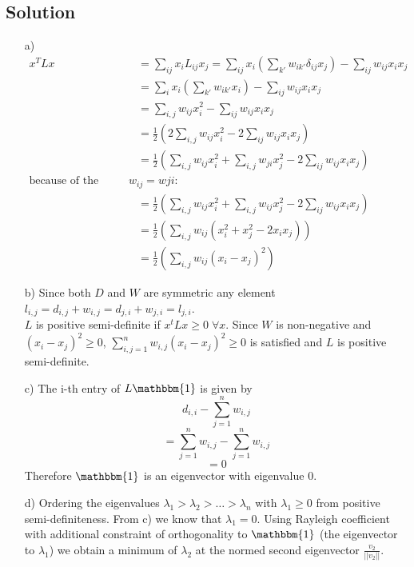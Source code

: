\documentclass[10pt]{article}
\numberwithin{equation}{section}
\begin{document}
\subsection*{Solution}
\begin{enumerate}
  \item[a)]{
\begin{align*}
	x^T Lx &= \sum_{ij} x_i L_{ij} x_j = \sum_{ij} x_i\left(\sum_{k'}w_{ik'} \delta_{ij} x_j\right) - \sum_{ij} w_{ij}x_i x_j \\
	&= \sum_{i} x_i\left(\sum_{k'}w_{ik'} x_i\right) - \sum_{ij} w_{ij}x_i x_j \\
  &= \sum_{i, j} w_{ij} x_i^2 - \sum_{ij} w_{ij}x_i x_j  \\
	&= \frac{1}{2} \left( 2 \sum_{i, j} w_{ij} x_i^2 - 2\sum_{ij} w_{ij}x_i x_j\right) \\
	&= \frac{1}{2} \left(  \sum_{i, j} w_{ij} x_i^2 + \sum_{i, j} w_{ji} x_j^2 - 2\sum_{ij}w_{ij}x_i x_j\right) \\
\text{because of the symmetry of W} w_{ij} = w{ji}:\\
	&= \frac{1}{2} \left(  \sum_{i, j} w_{ij} x_i^2 + \sum_{i, j} w_{ij} x_j^2 - 2\sum_{ij}w_{ij}x_i x_j\right)\\
	&= \frac{1}{2} \left(  \sum_{i, j} w_{ij} (x_i^2 +  x_j^2 - 2 x_i x_j)\right)\\
	&=\frac{1}{2} \left(  \sum_{i, j} w_{ij} (x_i-x_j)^2\right)
\end{align*} 
    }
  \item[b)]{
      Since both $D$ and $W$ are symmetric any element $l_{i,j} = d_{i,j} + w_{i,j} = d_{j,i} + w_{j,i} = l_{j,i}$.\\ $L$ is positive semi-definite if $x^t Lx \geq 0 \; \forall x$. Since $W$ is non-negative and $(x_i - x_j)^2 \geq 0$, $\sum_{i,j=1}^n w_{i,j} (x_i - x_j)^2 \geq 0$ is satisfied and $L$ is positive semi-definite.
    }
  \item[c)]{
      The i-th entry of $L \mathbbm{1}$ is given by
      $$d_{i,i} - \sum_{j=1}^n w_{i,j}$$
      $$= \sum_{j=1}^n w_{i,j}- \sum_{j=1}^n w_{i,j}$$
      $$=0$$
      Therefore $\mathbbm{1}$ is an eigenvector with eigenvalue $0$.
    }
  \item[d)]{
      Ordering the eigenvalues $\lambda_1 > \lambda_2 > \dots > \lambda_n$ with $\lambda_1 \geq 0$ from positive semi-definiteness. From c) we know that $\lambda_1 = 0$. Using Rayleigh coefficient with additional constraint of orthogonality to $\mathbbm{1}$ (the eigenvector to $\lambda_1$) we obtain a minimum of $\lambda_2$ at the normed second eigenvector $\frac{v_2}{||v_2||}$.
    }
\end{enumerate}
\end{document}
